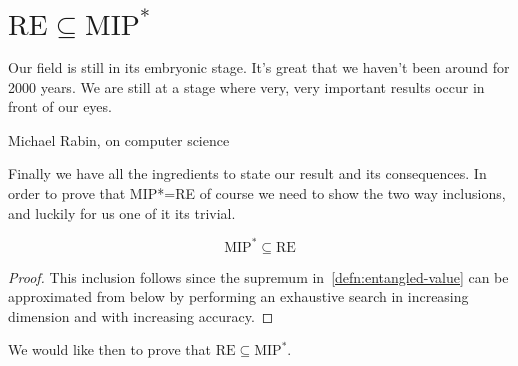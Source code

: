 \section{$\text{RE} \subseteq \text{MIP}^*$}
\epigraph{Our field is still in its embryonic stage. It's great that we haven't been around
for 2000 years. We are still at a stage where very, very important results occur
in front of our eyes.}{Michael Rabin, on computer science}

Finally we have all the ingredients to state our result and its consequences.
In order to prove that MIP*=RE of course we need to show the two way inclusions, and luckily for us one of it its trivial.

\begin{theorem}
    \begin{equation}
    \text{MIP}^{*} \subseteq \text{RE} 
    \end{equation}
\end{theorem}
\begin{proof}
    This inclusion follows since the supremum in~\ref{defn:entangled-value} can be approximated from below by performing an exhaustive search in increasing dimension and with increasing accuracy.
\end{proof}
We would like then to prove that $\text{RE} \subseteq \text{MIP}^{*}$.
 